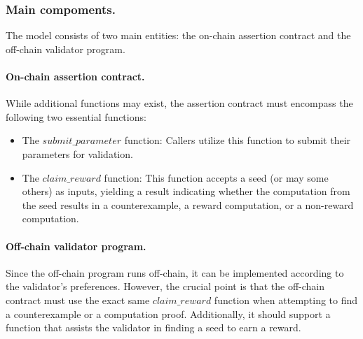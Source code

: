 \documentclass[runningheads]{llncs}
\begin{document}
\subsubsection{Main compoments.} The model consists of two main entities: the on-chain assertion contract and the off-chain validator program.
\paragraph{On-chain assertion contract.}
While additional functions may exist, the assertion contract must encompass the following two essential functions:
\begin{itemize}
\item The \( submit\_parameter \) function: Callers utilize this function to submit their parameters for validation. %
\item  The \( claim\_reward \) function: This function accepts a seed (or may some others) as inputs, yielding a result indicating whether the computation from the seed results in a counterexample, a reward computation, or a non-reward computation.
\end{itemize}
\paragraph{Off-chain validator program.}
Since the off-chain program runs off-chain, it can be implemented according to the validator's preferences. However, the crucial point is that the off-chain contract must use the exact same \( claim\_reward \) function when attempting to find a counterexample or a computation proof. Additionally, it should support a function that assists the validator in finding a seed to earn a reward.
\end{document}
